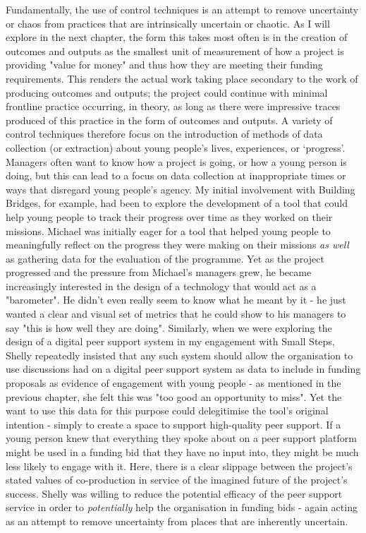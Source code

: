 Fundamentally, the use of control techniques is an attempt to remove uncertainty or chaos from practices that are intrinsically uncertain or chaotic. As I will explore in the next chapter, the form this takes most often is in the creation of outcomes and outputs as the smallest unit of measurement of how a project is providing "value for money" and thus how they are meeting their funding requirements. This renders the actual work taking place secondary to the work of producing outcomes and outputs; the project could continue with minimal frontline practice occurring, in theory, as long as there were impressive traces produced of this practice in the form of outcomes and outputs. A variety of control techniques therefore focus on the introduction of methods of data collection (or extraction) about young people’s lives, experiences, or `progress'. Managers often want to know how a project is going, or how a young person is doing, but this can lead to a focus on data collection at inappropriate times or ways that disregard young people’s agency. My initial involvement with Building Bridges, for example, had been to explore the development of a tool that could help young people to track their progress over time as they worked on their missions. Michael was initially eager for a tool that helped young people to meaningfully reflect on the progress they were making on their missions \emph{as well} as gathering data for the evaluation of the programme. Yet as the project progressed and the pressure from Michael’s managers grew, he became increasingly interested in the design of a technology that would act as a "barometer". He didn’t even really seem to know what he meant by it - he just wanted a clear and visual set of metrics that he could show to his managers to say "this is how well they are doing". Similarly, when we were exploring the design of a digital peer support system in my engagement with Small Steps, Shelly repeatedly insisted that any such system should allow the organisation to use discussions had on a digital peer support system as data to include in funding proposals as evidence of engagement with young people - as mentioned in the previous chapter, she felt this was "too good an opportunity to miss". Yet the want to use this data for this purpose could delegitimise the tool's original intention - simply to create a space to support high-quality peer support. If a young person knew that everything they spoke about on a peer support platform might be used in a funding bid that they have no input into, they might be much less likely to engage with it. Here, there is a clear slippage between the project's stated values of co-production in service of the imagined future of the project's success. Shelly was willing to reduce the potential efficacy of the peer support service in order to \emph{potentially} help the organisation in funding bids - again acting as an attempt to remove uncertainty from places that are inherently uncertain.

